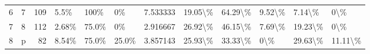 \begin{tabular}{llrlllrlllll}
6 &  7 &      109 &                5.5\% &                                       100\% &                                               0\% &                7.533333 &       19.05\textbackslash \% &         64.29\textbackslash \% &                9.52\textbackslash \% &              7.14\textbackslash \% &           0\textbackslash \% \\
7 &  8 &      112 &               2.68\% &                                      75.0\% &                                               0\% &                2.916667 &       26.92\textbackslash \% &         46.15\textbackslash \% &                7.69\textbackslash \% &             19.23\textbackslash \% &           0\textbackslash \% \\
8 &  p &       82 &               8.54\% &                                      75.0\% &                                            25.0\% &                3.857143 &       25.93\textbackslash \% &         33.33\textbackslash \% &                   0\textbackslash \% &             29.63\textbackslash \% &       11.11\textbackslash \% \\
\bottomrule
\end{tabular}
